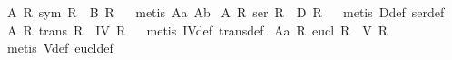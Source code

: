 \begin{isabellebody}
\isamarkupfalse%
\ A{}{\isacharcolon}\ {\isachardoublequoteopen}{\isacharparenleft}{\isasymforall}R{\isachardot}\ {\isacharparenleft}sym\ R{\isacharparenright}\ {\isasymlongleftrightarrow}\ {\isacharparenleft}B\ R{\isacharparenright}{\isacharparenright}{\isachardoublequoteclose}%
\isadelimproof
\ %
\endisadelimproof
%
\isatagproof
{}\isamarkupfalse%
\ {\isacharparenleft}metis\ A{}{\isacharunderscore}a\ A{}{\isacharunderscore}b{\isacharparenright}%
\endisatagproof
{\isafoldproof}%
%
\isadelimproof
%
\endisadelimproof
%
\isamarkuptrue%
\isamarkupfalse%
\ A{}{\isacharcolon}\ {\isachardoublequoteopen}{\isacharparenleft}{\isasymforall}R{\isachardot}\ {\isacharparenleft}ser\ R{\isacharparenright}\ {\isasymlongleftrightarrow}\ {\isacharparenleft}D\ R{\isacharparenright}{\isacharparenright}{\isachardoublequoteclose}%
\isadelimproof
\ %
\endisadelimproof
%
\isatagproof
{}\isamarkupfalse%
\ {\isacharparenleft}metis\ D{\isacharunderscore}def\ ser{\isacharunderscore}def{\isacharparenright}%
\endisatagproof
{\isafoldproof}%
%
\isadelimproof
%
\endisadelimproof
%
\isamarkuptrue%
\isamarkupfalse%
\ A{}{\isacharcolon}\ {\isachardoublequoteopen}{\isacharparenleft}{\isasymforall}R{\isachardot}\ {\isacharparenleft}trans\ R{\isacharparenright}\ {\isasymlongleftrightarrow}\ {\isacharparenleft}IV\ R{\isacharparenright}{\isacharparenright}{\isachardoublequoteclose}%
\isadelimproof
\ %
\endisadelimproof
%
\isatagproof
{}\isamarkupfalse%
\ {\isacharparenleft}metis\ IV{\isacharunderscore}def\ trans{\isacharunderscore}def{\isacharparenright}%
\endisatagproof
{\isafoldproof}%
%
\isadelimproof
%
\endisadelimproof
%
\isamarkuptrue%
\isamarkupfalse%
\ A{}{\isacharunderscore}a{\isacharcolon}\ {\isachardoublequoteopen}{\isacharparenleft}{\isasymforall}R{\isachardot}\ {\isacharparenleft}eucl\ R{\isacharparenright}\ {\isasymlongrightarrow}\ {\isacharparenleft}V\ R{\isacharparenright}{\isacharparenright}{\isachardoublequoteclose}%
\isadelimproof
\ %
\endisadelimproof
%
\isatagproof
{}\isamarkupfalse%
\ {\isacharparenleft}metis\ V{\isacharunderscore}def\ eucl{\isacharunderscore}def{\isacharparenright}%
\endisatagproof
{\isafoldproof}%
%
\isadelimproof
%
\endisadelimproof
\isanewline
{}\isamarkupfalse%

\end{isabellebody}
